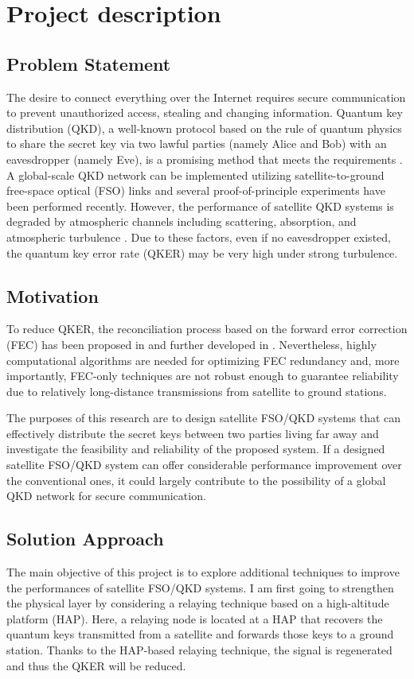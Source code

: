 \documentclass[12pt,onecolumn,letterpaper]{IEEEtran}
\begin{document}
\section{Project description}
\subsection{Problem Statement}
The desire to connect everything over the Internet requires secure communication to prevent unauthorized access, stealing and changing information. Quantum key distribution (QKD), a well-known protocol based on the rule of quantum physics to share the secret key via two lawful parties (namely Alice and Bob) with an eavesdropper (namely Eve), is a promising method that meets the requirements \cite{Yuen2016}. A global-scale QKD network can be implemented utilizing satellite-to-ground free-space optical (FSO) links and several proof-of-principle experiments have been performed recently. However, the performance of satellite QKD systems is degraded by atmospheric channels including scattering, absorption, and atmospheric turbulence \cite{Vallone2015, Liao2018}. Due to these factors, even if no eavesdropper existed, the quantum key error rate (QKER) may be very high under strong turbulence. 

\subsection{Motivation}
To reduce QKER, the reconciliation process based on the forward error correction (FEC) has been proposed in \cite{Buttler2003} and further developed in \cite{Ai2020}. Nevertheless, highly computational algorithms are needed for optimizing FEC redundancy and, more importantly, FEC-only techniques are not robust enough to guarantee reliability due to relatively long-distance transmissions from satellite to ground stations.

The purposes of this research are to design satellite FSO/QKD systems that can effectively distribute the secret keys between two parties living far away and investigate the feasibility and reliability of the proposed system. If a designed satellite FSO/QKD system can offer considerable performance improvement over the conventional ones, it could largely contribute to the possibility of a global QKD network for secure communication.

\subsection{Solution Approach}
The main objective of this project is to explore additional techniques to improve the performances of satellite FSO/QKD systems. I am first going to strengthen the physical layer by considering a relaying technique based on a high-altitude platform (HAP). Here, a relaying node is located at a HAP that recovers the quantum keys transmitted from a satellite and forwards those keys to a ground station. Thanks to the HAP-based relaying technique, the signal is regenerated and thus the QKER will be reduced. 
\end{document}
